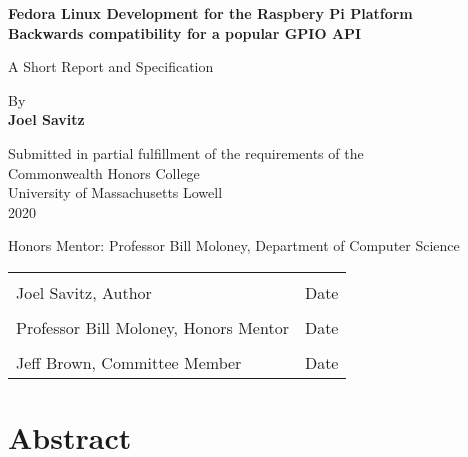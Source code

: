 \documentclass{article}
\author{Joel Savitz}
\begin{document}
\begin{titlepage}
   \begin{center}
       \vspace*{1cm}

	\textbf{Fedora Linux Development for the Raspbery Pi Platform \\
		\small Backwards compatibility for a popular GPIO API}

       \vspace{0.5cm}
        A Short Report and Specification
            
       \vspace{1.5cm}

       By \\
       \textbf{Joel Savitz}

       \vfill
            
       Submitted in partial fulfillment
       of the requirements of the \\
       Commonwealth Honors College \\
       University of Massachusetts Lowell \\
       2020
            
       \vspace{0.8cm}
     
            
       Honors Mentor: Professor Bill Moloney, Department of Computer Science

\noindent\begin{tabular}{ll}
	\\[4ex]
	\makebox[4in]{\hrulefill} & \makebox[1.5in]{\hrulefill} \\
	Joel Savitz, Author & Date \\[5ex]
	\makebox[4in]{\hrulefill} & \makebox[1.5in]{\hrulefill} \\
	Professor Bill Moloney, Honors Mentor & Date \\[5ex]
	\makebox[4in]{\hrulefill} & \makebox[1.5in]{\hrulefill} \\
	Jeff Brown, Committee Member & Date \\[5ex]
\end{tabular}

            
   \end{center}
\end{titlepage}

\section{Abstract}
\end{document}
